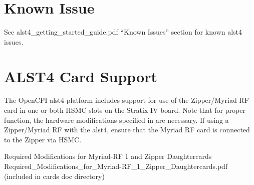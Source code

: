 \section*{Known Issue}
See alst4\_getting\_started\_guide.pdf ``Known Issues'' section for known alst4 issues.
\section*{ALST4 Card Support}
The OpenCPI alst4 platform includes support for use of the Zipper/Myriad RF card in one or both HSMC slots on the Stratix IV board. Note that for proper function, the hardware modifications specified in \cite{zipper_mods} are necessary. If using a Zipper/Myriad RF with the alst4, ensure that the Myriad RF card is connected to the Zipper via HSMC.

\pagebreak
  \begin{thebibliography}{1}

   Required Modifications for Myriad-RF 1 and Zipper Daughtercards\\
	 Required\_Modifications\_for\_Myriad-RF\_1\_Zipper\_Daughtercards.pdf (included in cards doc directory)

  \end{thebibliography}


